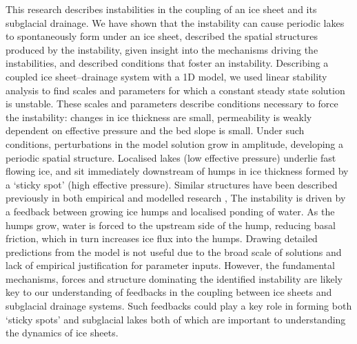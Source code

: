 \documentclass[journal abbreviation, manuscript]{copernicus}
\begin{document}
This research describes instabilities in the coupling of an ice sheet and its subglacial drainage. We have shown that the instability can cause periodic lakes to spontaneously form under an ice sheet, described the spatial structures produced by the instability, given insight into the mechanisms driving the instabilities, and described conditions that foster an instability.
Describing a coupled ice sheet--drainage system with a  1D model, we used linear stability analysis to find scales and parameters for which a constant steady state solution is unstable.
These scales and parameters describe conditions necessary to force the instability: changes in ice thickness are small, permeability is weakly dependent on effective pressure and the bed slope is small.
Under such conditions, perturbations in the model solution grow in amplitude, developing a periodic spatial structure. Localised lakes (low effective pressure) underlie fast flowing ice, and sit immediately downstream of humps in ice thickness formed by a `sticky spot' (high effective pressure). Similar structures have been described previously in both empirical and modelled research \citep{fricker2010synthesizing,sergienko2011sticky}, 
The instability is driven by a feedback between growing ice humps and localised ponding of water. As the humps grow, water is forced to the upstream side of the hump, reducing basal friction, which in turn increases ice flux into the humps. 
Drawing detailed predictions from the model is not useful due to the broad scale of solutions and lack of empirical justification for parameter inputs. However, the fundamental mechanisms, forces and structure dominating the identified instability are likely key to our understanding of feedbacks in the coupling between ice sheets and subglacial drainage systems. Such feedbacks could play a key role in forming both `sticky spots' and subglacial lakes both of which are important to understanding the dynamics of ice sheets.




\end{document}
